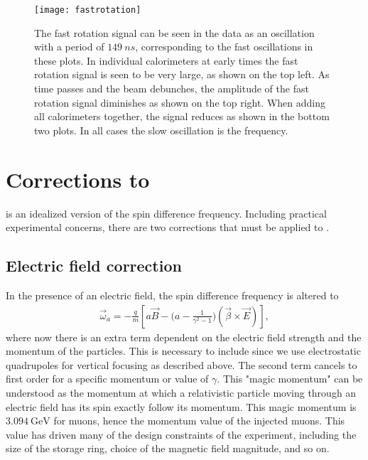 \begin{figure}[]
    \centering
    \texttt{[image: fastrotation]}
    \caption[Beam debunching fast rotation]{The fast rotation signal can be seen in the data as an oscillation with a period of $\SI{149}{ns}$, corresponding to the fast oscillations in these plots. In individual calorimeters at early times the fast rotation signal is seen to be very large, as shown on the top left. As time passes and the beam debunches, the amplitude of the fast rotation signal diminishes as shown on the top right. When adding all calorimeters together, the signal reduces as shown in the bottom two plots. In all cases the slow oscillation is the \gmtwo frequency.}
    \label{fig:fastrotation}
\end{figure}



\section{Corrections to \texorpdfstring{\wa}{wa}}

 is an idealized version of the spin difference frequency. Including practical experimental concerns, there are two corrections that must be applied to \wa.

\subsection{Electric field correction}
\label{sub:electric_field_correction}

In the presence of an electric field, the spin difference frequency is altered to 
        \begin{align} \label{eq:waelectric}
            \vec{\omega}_{a} = -\frac{q}{m} [a\vec{B} - \Big(a - \frac{1}{\gamma^{2}-1}\Big)(\vec{\beta} \times \vec{E}) ],
        \end{align}
where now there is an extra term dependent on the electric field strength and the momentum of the particles. This is necessary to include since we use electrostatic quadrupoles for vertical focusing as described above. The second term cancels to first order for a specific momentum or value of $\gamma$. This "magic momentum" can be understood as the momentum at which a relativistic particle moving through an electric field has its spin exactly follow its momentum. This magic momentum is $\SI{3.094}{\GeV}$ for muons, hence the momentum value of the injected muons. This value has driven many of the design constraints of the \gmtwo experiment, including the size of the storage ring, choice of the magnetic field magnitude, and so on.

